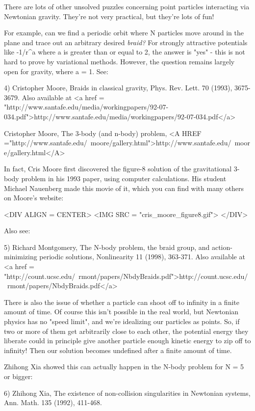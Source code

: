 There are lots of other unsolved puzzles concerning point particles
interacting via Newtonian gravity.  They're not very practical, but
they're lots of fun!

For example, can we find a periodic orbit where N particles move around
in the plane and trace out an arbitrary desired \emph{braid?}  For 
strongly attractive potentials like -1/r^{a} where a is greater than 
or equal to 2, the answer is "yes" - this is not hard
to prove by variational methods.  However, the question remains 
largely open for gravity, where a = 1.  See:

4) Cristopher Moore, Braids in classical gravity, Phys. Rev.
Lett. 70 (1993), 3675-3679.  Also available at <a href = "http://www.santafe.edu/media/workingpapers/92-07-034.pdf">http://www.santafe.edu/media/workingpapers/92-07-034.pdf</a>

Cristopher Moore, The 3-body (and n-body) problem, 
<A HREF ="http://www.santafe.edu/~moore/gallery.html">http://www.santafe.edu/~moore/gallery.html</A>


In fact, Cris Moore first discovered the figure-8 solution of
the gravitational 3-body problem in his 1993 paper, using computer 
calculations.  His student Michael Nauenberg made this movie of it, which you
can find with many others on Moore's website:

<DIV ALIGN = CENTER>
<IMG SRC = "cris_moore_figure8.gif">
</DIV>

Also see:

5) Richard Montgomery, The N-body problem, the braid group, and
action-minimizing periodic solutions, Nonlinearity 11 (1998), 363-371.
Also available at <a href = "http://count.ucsc.edu/~rmont/papers/NbdyBraids.pdf">http://count.ucsc.edu/~rmont/papers/NbdyBraids.pdf</a>

There is also the issue of whether a particle can shoot off to infinity
in a finite amount of time.  Of course this isn't possible in the real
world, but Newtonian physics has no "speed limit", and we're
idealizing our particles as points.  So, if two or more of them get
arbitrarily close to each other, the potential energy they liberate
could in principle give another particle enough kinetic energy to zip
off to infinity!  Then our solution becomes undefined after a finite
amount of time.

Zhihong Xia showed this can actually happen in the N-body problem
for N = 5 or bigger:

6) Zhihong Xia, The existence of non-collision singularities in Newtonian
systems, Ann. Math. 135 (1992), 411-468.

